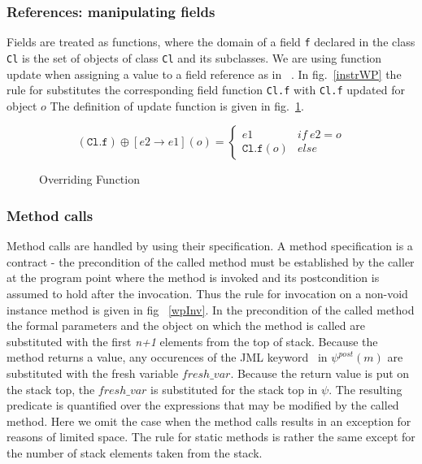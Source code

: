 \subsubsection{References: manipulating fields}
Fields are treated as functions, where the domain of a field \texttt{f} 
declared in the class \texttt{Cl} is the set of objects of class \texttt{Cl} and its subclasses.
We are using function update when assigning a value to a field reference as in ~\cite{B00ppp}. 
In fig.~\ref{instrWP} the rule for  substitutes the corresponding field function \texttt{Cl.f} with \texttt{Cl.f} updated for object $o$ 
The definition of update function is given in fig.~\ref{override}.

\begin{figure}
$$
 (\texttt{Cl.f})\oplus[e2 \rightarrow e1](o) = \left\{ \begin{array} {ll}
						       e1 & if \ e2 = o \\
					               \texttt{Cl.f}(o)	& else 
	\end{array}\right. 
$$ 
\caption{Overriding Function}
\label{override}
\end{figure}



\subsubsection{Method calls}
Method calls are handled by using their specification. A method specification is a contract - the precondition of the called method
must be established by the caller at the program point where the method is invoked and its postcondition is assumed to hold after the invocation. Thus the rule for
invocation on a non-void instance method is given in fig ~\ref{wpInv}. In the precondition of the called method the formal parameters and the object on which the method is called are substituted with the first \textit{n+1} elements from the top of stack. 
Because the method returns a value, any occurences of the JML keyword \result \ in $\psi^{post}(m)$  are substituted with the fresh variable $fresh\_var$.  
Because the return value is put on the stack top, the $fresh\_var$ is substituted for the stack top in $\psi$. The resulting predicate is quantified over the 
expressions that may be modified by the called method. Here we omit the case when the method calls results in an exception for reasons of limited space. 
The rule for static methods is rather the same except for the number of stack elements taken from the stack.  

